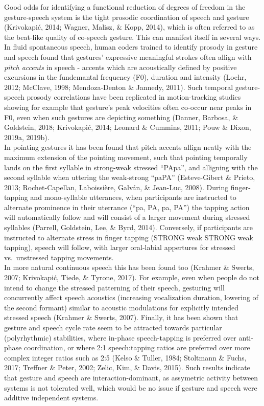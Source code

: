 \documentclass[
  man, noextraspace,floatsintext]{apa6}
\begin{document}
Good odds for identifying a functional reduction of degrees of freedom in the gesture-speech system is the tight prosodic coordination of speech and gesture (Krivokapić, 2014; Wagner, Malisz, \& Kopp, 2014), which is often referred to as the beat-like quality of co-speech gesture. This can manifest itself in several ways. In fluid spontaneous speech, human coders trained to identify prosody in gesture and speech found that gestures' expressive meaningful strokes often allign with \emph{pitch accents} in speech - accents which are acoustically defined by positive excursions in the fundemantal frequency (F0), duration and intensity (Loehr, 2012; McClave, 1998; Mendoza-Denton \& Jannedy, 2011). Such temporal gesture-speech prosody correlations have been replicated in motion-tracking studies showing for example that gesture's peak velocities often co-occur near peaks in F0, even when such gestures are depicting something (Danner, Barbosa, \& Goldstein, 2018; Krivokapić, 2014; Leonard \& Cummins, 2011; Pouw \& Dixon, 2019a, 2019b).\\
In pointing gestures it has been found that pitch accents allign neatly with the maximum extension of the pointing movement, such that pointing temporally lands on the first syllable in strong-weak stressed ``PApa'', and alligning with the second syllable when uttering the weak-strong ``paPA'' (Esteve-Gibert \& Prieto, 2013; Rochet-Capellan, Laboissière, Galván, \& Jean-Luc, 2008). During finger-tapping and mono-syllable utterances, when participants are instructed to alternate prominence in their uterrance (``pa, PA, pa, PA'') the tapping action will automatically follow and will consist of a larger movement during stressed syllables (Parrell, Goldstein, Lee, \& Byrd, 2014). Conversely, if participants are instructed to alternate stress in finger tapping (STRONG weak STRONG weak tapping), speech will follow, with larger oral-labial appertures for stressed vs.~unstressed tapping movements.\\
In more natural continuous speech this has been found too (Krahmer \& Swerts, 2007; Krivokapić, Tiede, \& Tyrone, 2017). For example, even when people do not intend to change the stressed patterning of their speech, gesturing will concurrently affect speech acoustics (increasing vocalization duration, lowering of the second formant) similar to acoustic modulations for explicitly intended stressed speech (Krahmer \& Swerts, 2007). Finally, it has been shown that gesture and speech cycle rate seem to be attracted towards particular (polyrhythmic) stabilities, where in-phase speech-tapping is preferred over anti-phase coordination, or where 2:1 speech:tapping ratios are preferred over more complex integer ratios such as 2:5 (Kelso \& Tuller, 1984; Stoltmann \& Fuchs, 2017; Treffner \& Peter, 2002; Zelic, Kim, \& Davis, 2015). Such results indicate that gesture and speech are interaction-dominant, as assymetric activity between systems is not tolerated well, which would be no issue if gesture and speech were additive independent systems.
\end{document}
